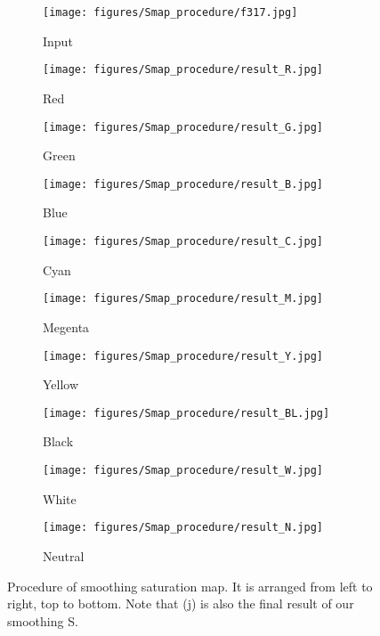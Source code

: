 \documentclass[runningheads]{llncs}
\begin{document}
\begin{figure}[htbp]
\centering

\begin{subfigure}[t]{0.17\linewidth}
\centering
\texttt{[image: figures/Smap\_procedure/f317.jpg]}
\caption{Input}
\end{subfigure}
\begin{subfigure}[t]{0.17\linewidth}
\centering
\texttt{[image: figures/Smap\_procedure/result\_R.jpg]}
\caption{Red }
\end{subfigure}
\begin{subfigure}[t]{0.17\linewidth}
\centering
\texttt{[image: figures/Smap\_procedure/result\_G.jpg]}
\caption{Green }
\end{subfigure}
\begin{subfigure}[t]{0.17\linewidth}
\centering
\texttt{[image: figures/Smap\_procedure/result\_B.jpg]}
\caption{Blue }
\end{subfigure}
\begin{subfigure}[t]{0.17\linewidth}
\centering
\texttt{[image: figures/Smap\_procedure/result\_C.jpg]}
\caption{Cyan }
\end{subfigure}

\begin{subfigure}[t]{0.17\linewidth}
\centering
\texttt{[image: figures/Smap\_procedure/result\_M.jpg]}
\caption{Megenta }
\end{subfigure}
\begin{subfigure}[t]{0.17\linewidth}
\centering
\texttt{[image: figures/Smap\_procedure/result\_Y.jpg]}
\caption{Yellow }
\end{subfigure}
\begin{subfigure}[t]{0.17\linewidth}
\centering
\texttt{[image: figures/Smap\_procedure/result\_BL.jpg]}
\caption{Black }
\end{subfigure}
\begin{subfigure}[t]{0.17\linewidth}
\centering
\texttt{[image: figures/Smap\_procedure/result\_W.jpg]}
\caption{White }
\end{subfigure}
\begin{subfigure}[t]{0.17\linewidth}
\centering
\texttt{[image: figures/Smap\_procedure/result\_N.jpg]}
\caption{Neutral }
\end{subfigure}
\caption{Procedure of smoothing saturation map. It is arranged from left to right, top to bottom. Note that (j) is also the final result of our smoothing S.}

\label{fig:smap}
\end{figure}
\end{document}
